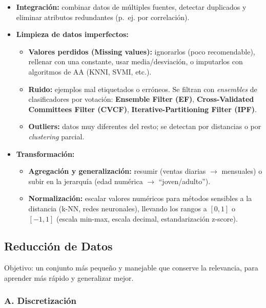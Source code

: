 \documentclass[12pt]{book} %
\providecommand{\tightlist}{%
  \setlength{\itemsep}{0pt}\setlength{\parskip}{0pt}}
\begin{document}
\begin{itemize}
\tightlist
\item
  \textbf{Integración:} combinar datos de múltiples fuentes, detectar
  duplicados y eliminar atributos redundantes (p.~ej. por correlación).
\item
  \textbf{Limpieza de datos imperfectos:}

  \begin{itemize}
  \tightlist
  \item
    \textbf{Valores perdidos (Missing values):} ignorarlos (poco
    recomendable), rellenar con una constante, usar media/desviación, o
    imputarlos con algoritmos de AA (KNNI, SVMI, etc.).
  \item
    \textbf{Ruido:} ejemplos mal etiquetados o erróneos. Se filtran con
    \emph{ensembles} de clasificadores por votación: \textbf{Ensemble
    Filter (EF)}, \textbf{Cross-Validated Committees Filter (CVCF)},
    \textbf{Iterative-Partitioning Filter (IPF)}.
  \item
    \textbf{Outliers:} datos muy diferentes del resto; se detectan por
    distancias o por \emph{clustering} parcial.
  \end{itemize}
\item
  \textbf{Transformación:}

  \begin{itemize}
  \tightlist
  \item
    \textbf{Agregación y generalización:} resumir (ventas diarias
    \(\to\) mensuales) o subir en la jerarquía (edad numérica \(\to\)
    ``joven/adulto'').
  \item
    \textbf{Normalización:} escalar valores numéricos para métodos
    sensibles a la distancia (k-NN, redes neuronales), llevando los
    rangos a \([0,1]\) o \([-1,1]\) (escala min-max, escala decimal,
    estandarización z-score).
  \end{itemize}
\end{itemize}

\hypertarget{reducciuxf3n-de-datos}{%
\subsection{Reducción de Datos}\label{reducciuxf3n-de-datos}}

Objetivo: un conjunto más pequeño y manejable que conserve la
relevancia, para aprender más rápido y generalizar mejor.

\hypertarget{a.-discretizaciuxf3n}{%
\subsubsection{A. Discretización}\label{a.-discretizaciuxf3n}}
\end{document}
